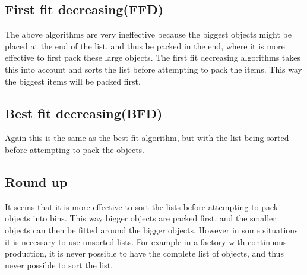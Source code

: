 \subsection*{First fit decreasing(FFD)}
The above algorithms are very ineffective because the biggest objects might be placed at the end of the list, and thus be packed in the end, where it is more effective to first pack these large objects.
The first fit decreasing algorithms takes this into account and sorts the list before attempting to pack the items. This way the biggest items will be packed first.

\subsection*{Best fit decreasing(BFD)}
Again this is the same as the best fit algorithm, but with the list being sorted before attempting to pack the objects.

\subsection*{Round up}
It seems that it is more effective to sort the lists before attempting to pack objects into bins. This way bigger objects are packed first, and the smaller objects can then be fitted around the bigger objects. However in some situations it is necessary to use unsorted lists. For example in a factory with continuous production, it is never possible to have the complete list of objects, and thus never possible to sort the list.
